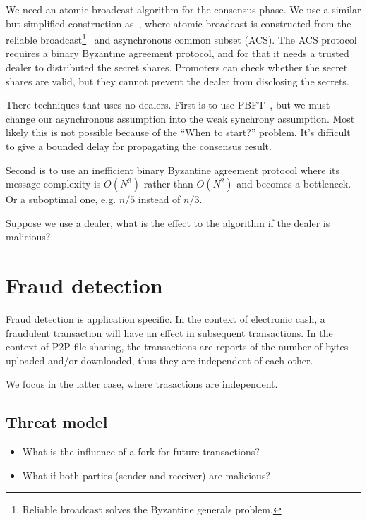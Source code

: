 We need an atomic broadcast algorithm for the consensus phase. We use a similar
but simplified construction as~\cite{miller2016honey}, where atomic broadcast is
constructed from the reliable broadcast\footnote{Reliable broadcast solves the
  Byzantine generals problem.}~\cite{bracha1984asynchronous} and asynchronous
common subset (ACS). The ACS protocol requires a binary Byzantine agreement
protocol, and for that it needs a trusted dealer to distributed the secret
shares. Promoters can check whether the secret shares are valid, but they cannot
prevent the dealer from disclosing the secrets.

There techniques that uses no dealers. First is to use
PBFT~\cite{castro1999practical}, but we must change our asynchronous assumption
into the weak synchrony assumption. Most likely this is not possible because of
the ``When to start?'' problem. It's difficult to give a bounded delay for
propagating the consensus result.

Second is to use an inefficient binary Byzantine agreement protocol where its
message complexity is $O(N^3)$ rather than $O(N^2)$ and becomes a bottleneck. Or
a suboptimal one, e.g. $n/5$ instead of $n/3$.

Suppose we use a dealer, what is the effect to the algorithm if the dealer is
malicious?

\section{Fraud detection}
Fraud detection is application specific. In the context of electronic cash, a
fraudulent transaction will have an effect in subsequent transactions. In the
context of P2P file sharing, the transactions are reports of the number of bytes
uploaded and/or downloaded, thus they are independent of each other.

We focus in the latter case, where trasactions are independent.

\subsection{Threat model}
\begin{itemize}
\item What is the influence of a fork for future transactions?
\item What if both parties (sender and receiver) are malicious?
\end{itemize}


